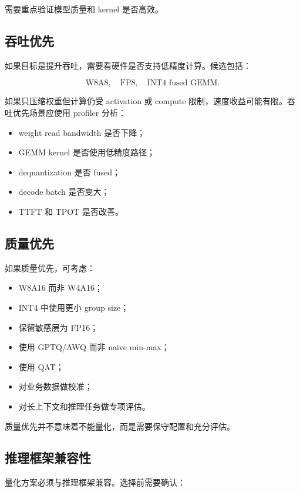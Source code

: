 需要重点验证模型质量和 kernel 是否高效。

\subsection{吞吐优先}
\label{subsec:quantization-throughput-first}

如果目标是提升吞吐，需要看硬件是否支持低精度计算。候选包括：

\[
\text{W8A8},
\quad
\text{FP8},
\quad
\text{INT4 fused GEMM}.
\]

如果只压缩权重但计算仍受 activation 或 compute 限制，速度收益可能有限。吞吐优先场景应使用 profiler 分析：

\begin{itemize}
\item weight read bandwidth 是否下降；
\item GEMM kernel 是否使用低精度路径；
\item dequantization 是否 fused；
\item decode batch 是否变大；
\item TTFT 和 TPOT 是否改善。
\end{itemize}

\subsection{质量优先}
\label{subsec:quantization-quality-first}

如果质量优先，可考虑：

\begin{itemize}
\item W8A16 而非 W4A16；
\item INT4 中使用更小 group size；
\item 保留敏感层为 FP16；
\item 使用 GPTQ/AWQ 而非 naive min-max；
\item 使用 QAT；
\item 对业务数据做校准；
\item 对长上下文和推理任务做专项评估。
\end{itemize}

质量优先并不意味着不能量化，而是需要保守配置和充分评估。

\subsection{推理框架兼容性}
\label{subsec:inference-framework-compatibility}

量化方案必须与推理框架兼容。选择前需要确认：

